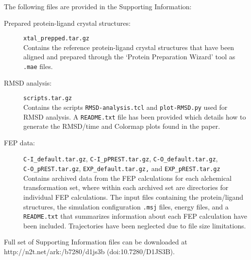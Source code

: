 \documentclass[journal=jctcce,manuscript=article]{achemso}
\begin{document}



\begin{suppinfo}
The following files are provided in the Supporting Information:
\begin{description}
\item [Prepared protein-ligand crystal structures:]\texttt{xtal\_prepped.tar.gz}\\
Contains the reference protein-ligand crystal structures that have been aligned and prepared through the `Protein Preparation Wizard' tool as \texttt{.mae} files.
\item [RMSD analysis:]\texttt{scripts.tar.gz}\\
Contains the scripts \texttt{RMSD-analysis.tcl} and \texttt{plot-RMSD.py} used for RMSD analysis. A \texttt{README.txt} file has been provided which details how to generate the RMSD/time and Colormap plots found in the paper. 
\item [FEP data:]\texttt{C-I\_default.tar.gz}, \texttt{C-I\_pPREST.tar.gz}, \texttt{C-O\_default.tar.gz}, \\ \texttt{C-O\_pREST.tar.gz}, \texttt{EXP\_default.tar.gz,} and \texttt{EXP\_pREST.tar.gz}\\
Contains archived data from the FEP calculations for each alchemical transformation set, where within each archived set are directories for individual FEP calculations. The input  files containing the protein/ligand structures, the simulation configuration \texttt{.msj} files, energy files, and a \texttt{README.txt} that summarizes information about each FEP calculation have been included. Trajectories have been neglected due to file size limitations.
\end{description}
Full set of Supporting Information files can be downloaded at http://n2t.net/ark:/b7280/d1js3b (doi:10.7280/D1JS3B).
\end{suppinfo}

\clearpage

\end{document}
